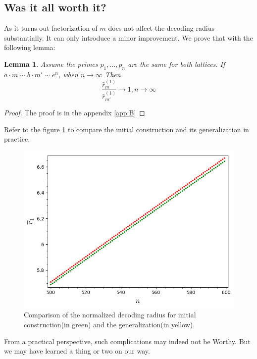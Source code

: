 \documentclass[12pt]{article}
\newtheorem{lemma}{Lemma}
\begin{document}
\subsection{Was it all worth it?}
\label{subsec:improvement_integers}

As it turns out factorization of $m$ does not affect the decoding radius substantially. It can only introduce a minor improvement. We prove that with the following lemma:

\begin{lemma}\label{lemma:no_imrovement}
Assume the primes $p_{1}, \dots, p_{n}$ are the same for both lattices. If $a \cdot m \sim b \cdot m' \sim e^n$, when $n \rightarrow \infty$ Then
\[
    \frac{\bar r_{m}^{(1)}}{\bar r_{m'}^{(1)}} \rightarrow 1, n \rightarrow \infty
\]
\end{lemma}
\begin{proof}
    The proof is in the appendix \ref{app:B}
\end{proof}

Refer to the figure \ref{fig:gen_int} to compare the initial construction and its generalization in practice.

\begin{figure}
  \includegraphics[width=\linewidth]{plot4.png}
  \caption{Comparison of the normalized decoding radius for initial construction(in green) and the generalization(in yellow). }
  \label{fig:gen_int}
\end{figure}

From a practical perspective, such complications may indeed not be Worthy. But we may have learned a thing or two on our way.
\end{document}
